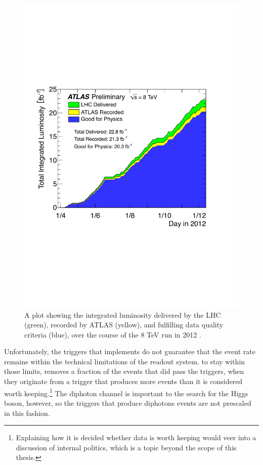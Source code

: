 \begin{figure}[htp]
\begin{minipage}[b]{.69\textwidth}
\hspace{-1em}\includegraphics[width=\textwidth]{figures/intlumi}
\end{minipage}\hfill\begin{minipage}[b]{.3\textwidth}
\caption{A plot showing the integrated luminosity delivered by the LHC (green), recorded by ATLAS (yellow), and fulfilling data quality criteria (blue), over the course of the 8 TeV run in 2012 \cite{publiclumi}.
\label{intlumi}}
\end{minipage}
\end{figure}

Unfortunately, the triggers that \atlas{} implements do not guarantee that the event rate remains within the technical limitations of the readout system. to stay within those limits, \atlas{} removes a fraction of the events that did pass the triggers, when they originate from a trigger that produces more events than it is considered worth keeping.\footnote{Explaining how it is decided whether data is worth keeping would veer into a discussion of \atlas{} internal politics, which is a topic beyond the scope of this thesis.} The diphoton channel is important to the search for the Higgs boson, however, so the triggers that produce diphotons events are not prescaled in this fashion.


